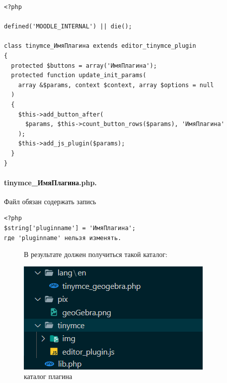 \documentclass[14pt,Diplom]{diplomwork}
\begin{document}


\begin{Verbatim}
<?php

defined('MOODLE_INTERNAL') || die();
  
class tinymce_ИмяПлагина extends editor_tinymce_plugin
{
  protected $buttons = array('ИмяПлагина');
  protected function update_init_params(
    array &$params, context $context, array $options = null
  )
  {
    $this->add_button_after(
      $params, $this->count_button_rows($params), 'ИмяПлагина'
    );
    $this->add_js_plugin($params);
  }
}

\end{Verbatim}


\paragraph{tinymce\_ИмяПлагина.php.} 
Файл обязан содержать запись\\
\begin{Verbatim}
<?php
$string['pluginname'] = 'ИмяПлагина'; 
где 'pluginname' нельзя изменять.
\end{Verbatim}

\newpage

\begin{figure}
В результате должен получиться такой каталог:
	\begin{center}
		\includegraphics[width=0.5\linewidth]{1.png}\caption{каталог плагина}
	\end{center}
\end{figure}
\end{document}
